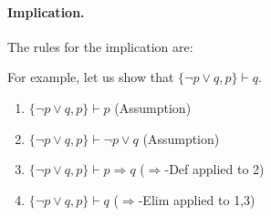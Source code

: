 \paragraph{Implication.}

The rules for the implication are:

\begin{prooftree}
\end{prooftree}

\begin{prooftree}
\end{prooftree}

\begin{prooftree}
\end{prooftree}

\begin{prooftree}
\end{prooftree}

For example, let us show that $\{\neg p\vee q,p\}\vdash q$.
\begin{enumerate}
    \item $\{\neg p\vee q, p\}\vdash p$ \hfill (\textsf{Assumption})
    \item $\{\neg p\vee q, p\}\vdash \neg p\vee q$ \hfill (\textsf{Assumption})
    \item $\{\neg p\vee q, p\}\vdash p\Rightarrow q$ \hfill (\textsf{$\Rightarrow$-Def} applied to 2)
    \item $\{\neg p\vee q, p\}\vdash q$ \hfill (\textsf{$\Rightarrow$-Elim} applied to 1,3)
\end{enumerate}

